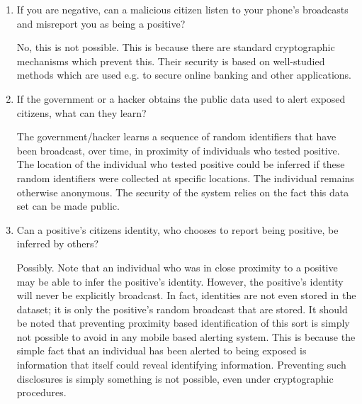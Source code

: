 \documentclass{article}
\begin{document}
\begin{enumerate}[leftmargin=*]

\item If you are negative, can a malicious citizen listen to your phone's broadcasts and misreport you as being a positive?
   
   No, this is not possible. This is because there are standard cryptographic mechanisms which prevent this. Their security is based on well-studied methods which are used e.g. to secure online banking and other applications. 


\item If the government or a hacker obtains the public data used to alert exposed citizens, what can they learn?

  The government/hacker learns a sequence of random identifiers that have been broadcast, over time, in proximity of individuals who tested positive. The location of the individual who tested positive could be inferred if these random identifiers were collected at specific locations. The individual remains otherwise anonymous. The security of the system relies on the fact this data set can be made public.


\item Can a positive's citizens identity, who chooses to report being positive, be inferred by others? 

Possibly. Note that an individual who was in close proximity to a positive may be able to infer the positive's identity.  However, the positive's identity will never be explicitly broadcast. In fact, identities are not even  stored in the dataset; it is only the positive's random broadcast that are stored.
It should be noted that preventing proximity based identification of this sort is simply not possible to avoid in any mobile based alerting system. This is because the simple fact that an individual has been alerted to being exposed is information that itself could reveal identifying information.  Preventing such disclosures is simply something is not possible, even under cryptographic procedures.

\end{enumerate}
\end{document}
